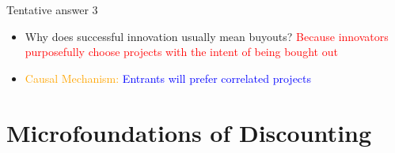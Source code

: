 \documentclass{beamer}
\newcommand{\flabel}[1]{\label{fig:#1}}
\numberwithin{equation}{section}
\begin{document}
\begin{frame}{Tentative answer 3}
\begin{itemize}
    \item Why does successful innovation usually mean buyouts? \textcolor{red}{Because innovators purposefully choose projects with the intent of being bought out}
    \item \textcolor{orange}{Causal Mechanism:} \textcolor{blue}{Entrants will prefer correlated projects}
\end{itemize}
\end{frame}


\section{Microfoundations of Discounting}
\end{document}
